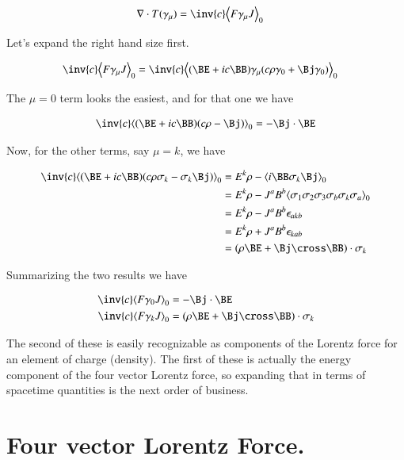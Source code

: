 \documentclass{article}
\begin{document}
\begin{align}
\grad \cdot T(\gamma_\mu) &= \inv{c} \gpgradezero{ F \gamma_\mu J } 
\end{align}

Let's expand the right hand size first.

\begin{align*}
\inv{c} \gpgradezero{ F \gamma_\mu J } &= \inv{c} \gpgradezero{ (\BE + i c \BB) \gamma_\mu (c \rho \gamma_0 + \Bj \gamma_0) } 
\end{align*}

The $\mu = 0$ term looks the easiest, and for that one we have

\begin{align*}
\inv{c} \gpgradezero{ (\BE + i c \BB) (c \rho - \Bj) }  = -\Bj \cdot \BE
\end{align*}

Now, for the other terms, say $\mu = k$, we have

\begin{align*}
\inv{c} \gpgradezero{ (\BE + i c \BB) (c \rho \sigma_k - \sigma_k \Bj ) } 
&= E^k \rho - \gpgradezero{ i \BB \sigma_k \Bj }  \\
&= E^k \rho - J^a B^b \gpgradezero{ \sigma_1 \sigma_2 \sigma_3 \sigma_b \sigma_k \sigma_a }  \\
&= E^k \rho - J^a B^b \epsilon_{a k b} \\
&= E^k \rho + J^a B^b \epsilon_{k a b} \\
&= (\rho \BE + \Bj \cross \BB) \cdot \sigma_k
\end{align*}

Summarizing the two results we have

\begin{align}
\inv{c} \gpgradezero{ F \gamma_0 J } &= -\Bj \cdot \BE \\
\inv{c} \gpgradezero{ F \gamma_k J } &= (\rho \BE + \Bj \cross \BB) \cdot \sigma_k
\end{align}

The second of these is easily recognizable as components of the Lorentz force for an element of charge (density).  The first
of these is actually the energy component of the four vector Lorentz force, so expanding that in terms of spacetime quantities
is the next order of business.

\section{ Four vector Lorentz Force. }
\end{document}
